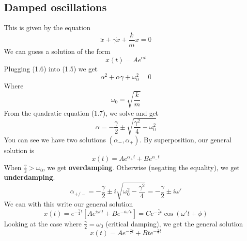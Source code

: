 \documentclass{report}
\numberwithin{equation}{section}
\begin{document}
\subsection{Damped oscillations}
This is given by the equation
\begin{equation}
	\ddot{x} + \gamma \dot{x} +\frac{k}{m}x =0
\end{equation}
We can guess a solution of the form
\begin{equation}
	x(t) = Ae^{\alpha t}
\end{equation}
Plugging (1.6) into (1.5) we get
\begin{equation}
	\alpha^2 + \alpha \gamma + \omega_0^2 = 0
\end{equation}
Where
\begin{equation}
	\omega_0 = \sqrt{\frac{k}{m}}
\end{equation}
From the quadratic equation (1.7), we solve and get
\begin{equation}
	\alpha = -\frac{\gamma}{2}\pm \sqrt{\frac{\gamma ^2}{4} -\omega_0^2}
\end{equation}
You can see we have two solutions $(\alpha_-, \alpha_+)$. By superposition, our general solution is
\begin{equation}
	x(t) = Ae^{\alpha_+t}+Be^{\alpha_-t}
\end{equation}
When $\frac{\gamma}{2} > \omega_0$, we get \textbf{overdamping}. Otherwise (negating the equality), we get \textbf{underdamping}.
\begin{equation}
	\alpha_{+/-} = -\frac{\gamma}{2} \pm i\sqrt{\omega_0^2-\frac{\gamma^2}{4}} = -\frac{\gamma}{2} \pm i\omega'
\end{equation}
We can with this write our general solution
\begin{equation}
	x(t) = e^{-\frac{\gamma}{2}t}\left[Ae^{i\omega' t} + B e^{-i\omega't}\right] = Ce^{-\frac{\gamma}{2}t}\cos(\omega't +\phi)
\end{equation}
Looking at the case where $\frac{\gamma}{2} = \omega_0$ (critical damping), we get the general solution
\begin{equation}
	x(t) = Ae^{-\frac{\gamma}{2}t} + Bte^{-\frac{\gamma}{2}t}
\end{equation}
\end{document}
